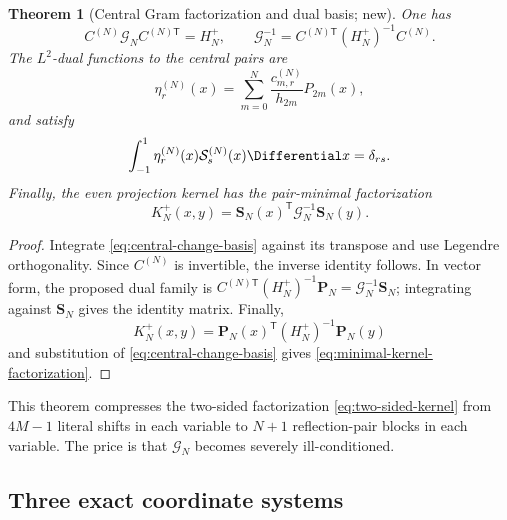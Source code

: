 \documentclass[11pt,oneside]{article}
\numberwithin{equation}{section}
\newtheorem{theorem}{Theorem}[section]
\theoremstyle{definition}
\theoremstyle{remark}
\begin{document}
\begin{theorem}[Central Gram factorization and dual basis; new]
\label{thm:central-Gram}
One has
\begin{equation}
 \boxed{
 C^{(N)}\mathcal G_N C^{(N)\mathsf T}=H_N^+,\qquad
 \mathcal G_N^{-1}=C^{(N)\mathsf T}(H_N^+)^{-1}C^{(N)}.}
 \label{eq:central-Gram-factorization}
\end{equation}
The $L^2$-dual functions to the central pairs are
\begin{equation}
 \eta_r^{(N)}(x)=\sum_{m=0}^{N}
 \frac{c_{m,r}^{(N)}}{h_{2m}}P_{2m}(x),
 \label{eq:central-dual}
\end{equation}
and satisfy
\begin{equation}
 \int_{-1}^{1}\eta_r^{(N)}(x)\mathcal S_s^{(N)}(x)\Differential x=\delta_{rs}.
 \label{eq:central-dual-biorth}
\end{equation}
Finally, the even projection kernel has the pair-minimal factorization
\begin{equation}
 \boxed{
 K_N^+(x,y)=\mathbf S_N(x)^{\mathsf T}\mathcal G_N^{-1}\mathbf S_N(y).}
 \label{eq:minimal-kernel-factorization}
\end{equation}
\end{theorem}

\begin{proof}
Integrate \eqref{eq:central-change-basis} against its transpose and use
Legendre orthogonality.  Since $C^{(N)}$ is invertible, the inverse identity
follows.  In vector form, the proposed dual family is
$C^{(N)\mathsf T}(H_N^+)^{-1}\mathbf P_N
=\mathcal G_N^{-1}\mathbf S_N$; integrating against $\mathbf S_N$ gives the
identity matrix.  Finally,
\[
 K_N^+(x,y)=\mathbf P_N(x)^{\mathsf T}(H_N^+)^{-1}\mathbf P_N(y)
\]
and substitution of \eqref{eq:central-change-basis} gives
\eqref{eq:minimal-kernel-factorization}.
\end{proof}

This theorem compresses the two-sided factorization
\eqref{eq:two-sided-kernel} from $4M-1$ literal shifts in each variable to
$N+1$ reflection-pair blocks in each variable.  The price is that
$\mathcal G_N$ becomes severely ill-conditioned.

\subsection{Three exact coordinate systems}
\end{document}
